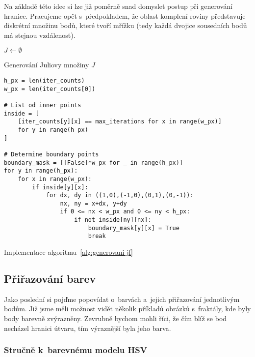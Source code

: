Na základě této idee si lze již poměrně snad domyslet postup při generování hranice. Pracujeme opět s~předpokladem, že oblast komplení roviny představuje diskrétní množinu bodů, které tvoří mřížku (tedy každá dvojice sousedních bodů má stejnou vzdálenost). 
\begin{algorithm}[h]
    $J\gets\emptyset$\;
    \;
    \caption{Generování Juliovy množiny $J$}
    \label{alg:generovani-jf}
\end{algorithm}
\begin{program}
\begin{lstlisting}[style=python]
h_px = len(iter_counts)
w_px = len(iter_counts[0])

# List od inner points
inside = [
    [iter_counts[y][x] == max_iterations for x in range(w_px)]
    for y in range(h_px)
]

# Determine boundary points
boundary_mask = [[False]*w_px for _ in range(h_px)]
for y in range(h_px):
    for x in range(w_px):
        if inside[y][x]:
            for dx, dy in ((1,0),(-1,0),(0,1),(0,-1)):
                nx, ny = x+dx, y+dy
                if 0 <= nx < w_px and 0 <= ny < h_px:
                    if not inside[ny][nx]:
                        boundary_mask[y][x] = True
                        break
\end{lstlisting}
    \caption{Implementace algoritmu~\ref{alg:generovani-jf}}
    \label{prog:generovani-jf}
\end{program}

\subsection{Přiřazování barev}\label{subsec:prirazovani-barev}

Jako poslední si pojďme popovídat o~barvách a~jejich přiřazování jednotlivým bodům. Již jsme měli možnost vidět několik příkladů obrázků s~fraktály, kde byly body barevně zvýrazněny. Zevrubně bychom mohli říci, že čím blíž se bod necházel hranici útvaru, tím výraznější byla jeho barva.

\subsubsection{Stručně k~barevnému modelu HSV}

